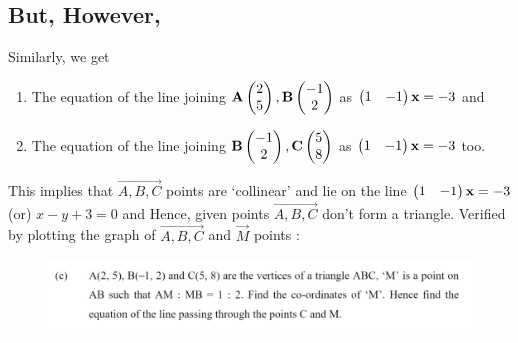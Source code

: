 \documentclass[journal,12pt,twocolumn]{IEEEtran}
\begin{document}
\subsection*{\large But, However,} Similarly, we get
\newline
\begin{enumerate}
    \item The equation of the line joining $\mathbf{A}\begin{pmatrix}2\\5\end{pmatrix}, \mathbf{B}\begin{pmatrix}-1\\2\end{pmatrix}$ as $\begin{pmatrix}1 & - 1\end{pmatrix}\mathbf{x} = -3$ and 
    \newline
    \item The equation of the line joining $\mathbf{B}\begin{pmatrix}-1\\2\end{pmatrix}, \mathbf{C}\begin{pmatrix}5\\8\end{pmatrix}$ as $\begin{pmatrix}1 & - 1\end{pmatrix}\mathbf{x}=-3$ too.\newline
\end{enumerate}
 This implies that $\vec{A,B,C}$ points are `collinear' and lie on the line $\begin{pmatrix}1 & - 1\end{pmatrix}\mathbf{x} = -3$ (or) $x-y+3=0$ and Hence, given points $\vec{A,B,C}$ don't form a triangle.
\newline
\large Verified by plotting the graph of $\vec{A,B,C}$ and $\vec{M}$ points :
\begin{figure}[ht!]
\centering
\includegraphics[width=\columnwidth]{prv1a.png}
\end{figure}
 
\end{document}
